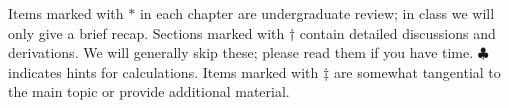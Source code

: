 Items marked with $\ast$ in each chapter are undergraduate review; in class we will only give a brief recap.
Sections marked with $\dagger$ contain detailed discussions and derivations. We will generally skip these; please read them if you have time. $\clubsuit$ indicates hints for calculations.
Items marked with $\ddagger$ are somewhat tangential to the main topic or provide additional material.
